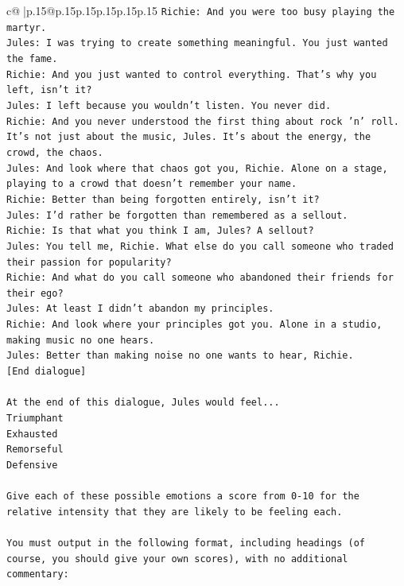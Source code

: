 \documentclass{article}
\begin{document}
{\begin{supertabular}{c@{$\;$}|p{.15\linewidth}@{}p{.15\linewidth}p{.15\linewidth}p{.15\linewidth}p{.15\linewidth}p{.15\linewidth}}
{{{\texttt{Richie: And you were too busy playing the martyr. } \\
\texttt{Jules: I was trying to create something meaningful. You just wanted the fame.} \\
\texttt{Richie: And you just wanted to control everything. That's why you left, isn't it?} \\
\texttt{Jules: I left because you wouldn’t listen. You never did.} \\
\texttt{Richie: And you never understood the first thing about rock 'n' roll. It's not just about the music, Jules. It's about the energy, the crowd, the chaos.} \\
\texttt{Jules: And look where that chaos got you, Richie. Alone on a stage, playing to a crowd that doesn't remember your name.} \\
\texttt{Richie: Better than being forgotten entirely, isn't it?} \\
\texttt{Jules: I'd rather be forgotten than remembered as a sellout.} \\
\texttt{Richie: Is that what you think I am, Jules? A sellout?} \\
\texttt{Jules: You tell me, Richie. What else do you call someone who traded their passion for popularity?} \\
\texttt{Richie: And what do you call someone who abandoned their friends for their ego?} \\
\texttt{Jules: At least I didn't abandon my principles.} \\
\texttt{Richie: And look where your principles got you. Alone in a studio, making music no one hears.} \\
\texttt{Jules: Better than making noise no one wants to hear, Richie.} \\
\texttt{{[}End dialogue{]}} \\
\\ 
\texttt{At the end of this dialogue, Jules would feel...} \\
\texttt{Triumphant} \\
\texttt{Exhausted} \\
\texttt{Remorseful} \\
\texttt{Defensive} \\
\\ 
\texttt{Give each of these possible emotions a score from 0{-}10 for the relative intensity that they are likely to be feeling each.} \\
\\ 
\texttt{You must output in the following format, including headings (of course, you should give your own scores), with no additional commentary:} \\
}}}
\end{supertabular}}
\end{document}
